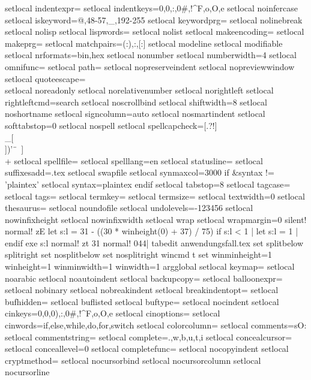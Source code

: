 {{{{setlocal indentexpr=
setlocal indentkeys=0{,0},:,0#,!^F,o,O,e
setlocal noinfercase
setlocal iskeyword=@,48-57,_,192-255
setlocal keywordprg=
setlocal nolinebreak
setlocal nolisp
setlocal lispwords=
setlocal nolist
setlocal makeencoding=
setlocal makeprg=
setlocal matchpairs=(:),{:},[:]
setlocal modeline
setlocal modifiable
setlocal nrformats=bin,hex
setlocal nonumber
setlocal numberwidth=4
setlocal omnifunc=
setlocal path=
setlocal nopreserveindent
setlocal nopreviewwindow
setlocal quoteescape=\\
setlocal noreadonly
setlocal norelativenumber
setlocal norightleft
setlocal rightleftcmd=search
setlocal noscrollbind
setlocal shiftwidth=8
setlocal noshortname
setlocal signcolumn=auto
setlocal nosmartindent
setlocal softtabstop=0
setlocal nospell
setlocal spellcapcheck=[.?!]\\_[\\])'\"\	\ ]\\+
setlocal spellfile=
setlocal spelllang=en
setlocal statusline=
setlocal suffixesadd=.tex
setlocal swapfile
setlocal synmaxcol=3000
if &syntax != 'plaintex'
setlocal syntax=plaintex
endif
setlocal tabstop=8
setlocal tagcase=
setlocal tags=
setlocal termkey=
setlocal termsize=
setlocal textwidth=0
setlocal thesaurus=
setlocal noundofile
setlocal undolevels=-123456
setlocal nowinfixheight
setlocal nowinfixwidth
setlocal wrap
setlocal wrapmargin=0
silent! normal! zE
let s:l = 31 - ((30 * winheight(0) + 37) / 75)
if s:l < 1 | let s:l = 1 | endif
exe s:l
normal! zt
31
normal! 044|
tabedit anwendungsfall.tex
set splitbelow splitright
set nosplitbelow
set nosplitright
wincmd t
set winminheight=1 winheight=1 winminwidth=1 winwidth=1
argglobal
setlocal keymap=
setlocal noarabic
setlocal noautoindent
setlocal backupcopy=
setlocal balloonexpr=
setlocal nobinary
setlocal nobreakindent
setlocal breakindentopt=
setlocal bufhidden=
setlocal buflisted
setlocal buftype=
setlocal nocindent
setlocal cinkeys=0{,0},0),:,0#,!^F,o,O,e
setlocal cinoptions=
setlocal cinwords=if,else,while,do,for,switch
setlocal colorcolumn=
setlocal comments=sO:%
setlocal commentstring=%
setlocal complete=.,w,b,u,t,i
setlocal concealcursor=
setlocal conceallevel=0
setlocal completefunc=
setlocal nocopyindent
setlocal cryptmethod=
setlocal nocursorbind
setlocal nocursorcolumn
setlocal nocursorline
}}}}
